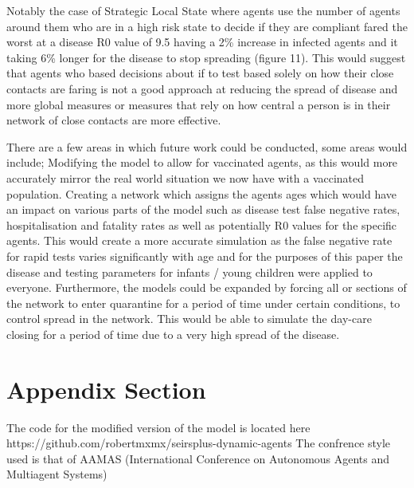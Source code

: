 \documentclass{article}
\begin{document}
Notably the case of Strategic Local State where agents use the number of agents around them who are in a high risk state to decide if they are compliant fared the worst at a disease R0 value of 9.5 having a 2\% increase in infected agents and it taking 6\% longer for the disease to stop spreading (figure 11). This would suggest that agents who based decisions about if to test based solely on how their close contacts are faring is not a good approach at reducing the spread of disease and more global measures or measures that rely on how central a person is in their network of close contacts are more effective. \newline 

There are a few areas in which future work could be conducted, some areas would include; Modifying the model to allow for vaccinated agents, as this would more accurately mirror the real world situation we now have with a vaccinated population. Creating a network which assigns the agents ages which would have an impact on various parts of the model such as disease test false negative rates, hospitalisation and fatality rates as well as potentially R0 values for the specific agents. This would create a more accurate simulation as the false negative rate for rapid tests varies significantly with age and for the purposes of this paper the disease and testing parameters for infants / young children were applied to everyone. Furthermore, the models could be expanded by forcing all or sections of the network to enter quarantine for a period of time under certain conditions, to control spread in the network. This would be able to simulate the day-care closing for a period of time due to a very high spread of the disease.


\newpage
\appendix

\section{Appendix Section}
The code for the modified version of the model is located here https://github.com/robertmxmx/seirsplus-dynamic-agents
The confrence style used is that of AAMAS (International Conference on Autonomous Agents and Multiagent Systems) 


{}

\end{document}
